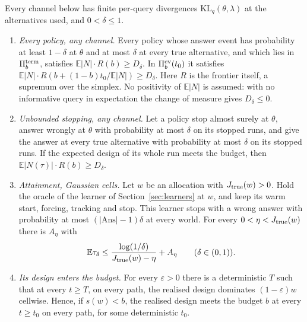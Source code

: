 \begin{theorem}
\label{thm:repairlaw}
Every channel below has finite per-query divergences $\mathrm{KL}_q(\theta,\lambda)$ at the
alternatives used, and $0<\delta\le1$.
\begin{enumerate}
\item[(i)] \emph{Every policy, any channel.} Every policy whose answer event has probability at
least $1-\delta$ at $\theta$ and at most $\delta$ at every true alternative, and which lies in
$\Pi_b^{\rm term}$, satisfies $\mathbb E|N|\cdot R(b)\ge D_\delta$. In $\Pi_b^{\rm ev}(t_0)$ it
satisfies $\mathbb E|N|\cdot R(b+(1-b)t_0/\mathbb E|N|)\ge D_\delta$. Here $R$ is the frontier
itself, a supremum over the simplex. No positivity of $\mathbb E|N|$ is assumed: with no
informative query in expectation the change of measure gives $D_\delta\le0$.
\item[(ii)] \emph{Unbounded stopping, any channel.} Let a policy stop almost surely at $\theta$,
answer wrongly at $\theta$ with probability at most $\delta$ on its stopped runs, and give the
answer at every true alternative with probability at most $\delta$ on its stopped runs. If the
expected design of its whole run meets the budget, then $\mathbb E|N(\tau)|\cdot R(b)\ge D_\delta$.
\item[(iii)] \emph{Attainment, Gaussian cells.} Let $w$ be an allocation with
$J_{\rm true}(w)>0$. Hold the oracle of the learner of Section~\ref{sec:learners} at $w$, and
keep its warm start, forcing, tracking and stop. This learner stops with a wrong answer with
probability at most $(|\mathrm{Ans}|-1)\delta$ at every world. For every
$0<\eta<J_{\rm true}(w)$ there is $A_\eta$ with
\[
\mathbb E\tau_\delta\le\frac{\log(1/\delta)}{J_{\rm true}(w)-\eta}+A_\eta
\qquad(\delta\in(0,1)).
\]
\item[(iv)] \emph{Its design enters the budget.} For every $\varepsilon>0$ there is a
deterministic $T$ such that at every $t\ge T$, on every path, the realised design dominates
$(1-\varepsilon)w$ cellwise. Hence, if $s(w)<b$, the realised design meets the budget $b$ at
every $t\ge t_0$ on every path, for some deterministic $t_0$.
\end{enumerate}
\end{theorem}

